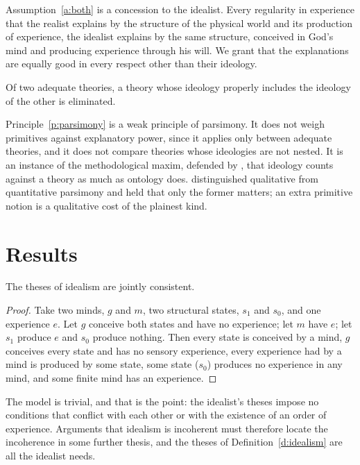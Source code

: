 \documentclass{situationist-preprint}
\begin{document}
Assumption~\ref{a:both} is a concession to the idealist. Every regularity in experience that the realist explains by the structure of the physical world and its production of experience, the idealist explains by the same structure, conceived in God's mind and producing experience through his will. We grant that the explanations are equally good in every respect other than their ideology.

\begin{principle}\label{p:parsimony}
Of two adequate theories, a theory whose ideology properly includes the ideology of the other is eliminated.
\end{principle}

Principle~\ref{p:parsimony} is a weak principle of parsimony. It does not weigh primitives against explanatory power, since it applies only between adequate theories, and it does not compare theories whose ideologies are not nested. It is an instance of the methodological maxim, defended by \citet{Sider2011}, that ideology counts against a theory as much as ontology does. \citet[87]{Lewis1973} distinguished qualitative from quantitative parsimony and held that only the former matters; an extra primitive notion is a qualitative cost of the plainest kind.

\section{Results}

\begin{proposition}\label{p:consistent}
The theses of idealism are jointly consistent.
\end{proposition}

\begin{proof}
Take two minds, $g$ and $m$, two structural states, $s_1$ and $s_0$, and one experience $e$. Let $g$ conceive both states and have no experience; let $m$ have $e$; let $s_1$ produce $e$ and $s_0$ produce nothing. Then every state is conceived by a mind, $g$ conceives every state and has no sensory experience, every experience had by a mind is produced by some state, some state ($s_0$) produces no experience in any mind, and some finite mind has an experience.
\end{proof}

The model is trivial, and that is the point: the idealist's theses impose no conditions that conflict with each other or with the existence of an order of experience. Arguments that idealism is incoherent must therefore locate the incoherence in some further thesis, and the theses of Definition~\ref{d:idealism} are all the idealist needs.
\end{document}
